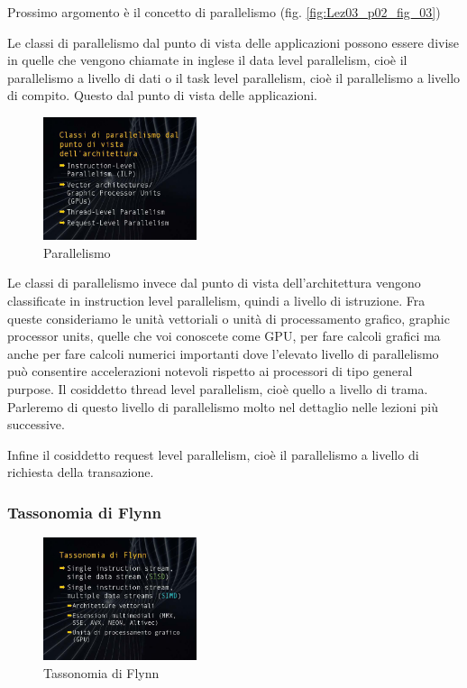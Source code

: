 Prossimo argomento è il concetto di parallelismo (fig. \ref{fig:Lez03_p02_fig_03})

Le classi di parallelismo dal punto di vista delle applicazioni possono essere divise in quelle che vengono chiamate in inglese il data level parallelism, cioè il parallelismo a livello di dati o il task level parallelism, cioè il parallelismo a livello di compito. Questo dal punto di vista delle applicazioni.

\FloatBarrier
\begin{figure}[H]
  \centering
  \includegraphics[width=0.40\textwidth,
                    trim=40 30 10 40, %
                    clip]
                    {images/Lez03_p02_fig_04.png}
  \caption{Parallelismo}
  \label{fig:Lez03_p02_fig_04}
\end{figure}
\FloatBarrier
\noindent

Le classi di parallelismo invece dal punto di vista dell'architettura vengono classificate in instruction level parallelism, quindi a livello di istruzione.
Fra queste consideriamo le unità vettoriali o unità di processamento grafico, graphic processor units, quelle che voi conoscete come GPU, per fare calcoli grafici ma anche per fare calcoli numerici importanti dove l'elevato livello di parallelismo può consentire accelerazioni notevoli rispetto ai processori di tipo general purpose.
Il cosiddetto thread level parallelism, cioè quello a livello di trama.
Parleremo di questo livello di parallelismo molto nel dettaglio nelle lezioni più successive.

Infine il cosiddetto request level parallelism, cioè il parallelismo a livello di richiesta della transazione.

\subsubsection{Tassonomia di Flynn}

\FloatBarrier
\begin{figure}[H]
  \centering
  \includegraphics[width=0.40\textwidth,
                    trim=40 80 10 40, %
                    clip]
                    {images/Lez03_p02_fig_05.png}
  \caption{Tassonomia di Flynn}
  \label{fig:Lez03_p02_fig_05}
\end{figure}
\FloatBarrier
\noindent

